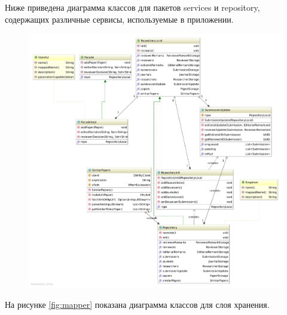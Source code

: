 Ниже приведена диаграмма классов для пакетов services и repository, содержащих различные сервисы, используемые в приложении.

\begin{figure}[H]
\centering
\includegraphics[width=\textwidth]{diagram2.pdf}
\caption{}
\end{figure}

На рисунке \ref{fig:mapper} показана диаграмма классов для слоя хранения.

